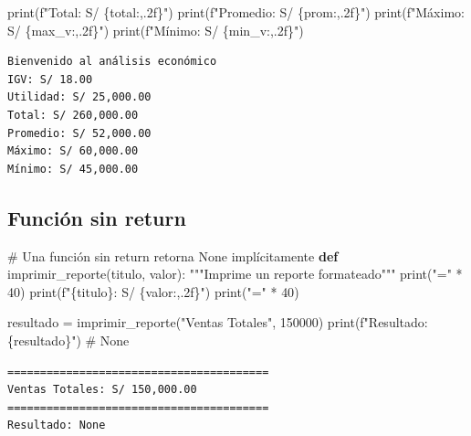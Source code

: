 \documentclass[
  doc,
  floatsintext,
  longtable,
  a4paper,
  nolmodern,
  notxfonts,
  notimes,
  12pt,
  colorlinks=true,linkcolor=blue,citecolor=blue,urlcolor=blue]{apa7}
\newenvironment{Shaded}{\begin{snugshade}}{\end{snugshade}}
\newcommand{\BuiltInTok}[1]{\textcolor[rgb]{0.00,0.23,0.31}{#1}}
\newcommand{\CommentTok}[1]{\textcolor[rgb]{0.37,0.37,0.37}{#1}}
\newcommand{\DecValTok}[1]{\textcolor[rgb]{0.68,0.00,0.00}{#1}}
\newcommand{\KeywordTok}[1]{\textcolor[rgb]{0.00,0.23,0.31}{\textbf{#1}}}
\newcommand{\NormalTok}[1]{\textcolor[rgb]{0.00,0.23,0.31}{#1}}
\newcommand{\OperatorTok}[1]{\textcolor[rgb]{0.37,0.37,0.37}{#1}}
\newcommand{\SpecialCharTok}[1]{\textcolor[rgb]{0.37,0.37,0.37}{#1}}
\newcommand{\SpecialStringTok}[1]{\textcolor[rgb]{0.13,0.47,0.30}{#1}}
\newcommand{\StringTok}[1]{\textcolor[rgb]{0.13,0.47,0.30}{#1}}
\begin{document}
\begin{Shaded}
\begin{Highlighting}[]
\BuiltInTok{print}\NormalTok{(}\SpecialStringTok{f"Total: S/ }\SpecialCharTok{\{}\NormalTok{total}\SpecialCharTok{:,.2f\}}\SpecialStringTok{"}\NormalTok{)}
\BuiltInTok{print}\NormalTok{(}\SpecialStringTok{f"Promedio: S/ }\SpecialCharTok{\{}\NormalTok{prom}\SpecialCharTok{:,.2f\}}\SpecialStringTok{"}\NormalTok{)}
\BuiltInTok{print}\NormalTok{(}\SpecialStringTok{f"Máximo: S/ }\SpecialCharTok{\{}\NormalTok{max\_v}\SpecialCharTok{:,.2f\}}\SpecialStringTok{"}\NormalTok{)}
\BuiltInTok{print}\NormalTok{(}\SpecialStringTok{f"Mínimo: S/ }\SpecialCharTok{\{}\NormalTok{min\_v}\SpecialCharTok{:,.2f\}}\SpecialStringTok{"}\NormalTok{)}
\end{Highlighting}
\end{Shaded}

\begin{verbatim}
Bienvenido al análisis económico
IGV: S/ 18.00
Utilidad: S/ 25,000.00
Total: S/ 260,000.00
Promedio: S/ 52,000.00
Máximo: S/ 60,000.00
Mínimo: S/ 45,000.00
\end{verbatim}

\subsection{Función sin return}\label{funciuxf3n-sin-return}

\begin{Shaded}
\begin{Highlighting}[]
\CommentTok{\# Una función sin return retorna None implícitamente}
\KeywordTok{def}\NormalTok{ imprimir\_reporte(titulo, valor):}
    \CommentTok{"""Imprime un reporte formateado"""}
    \BuiltInTok{print}\NormalTok{(}\StringTok{"="} \OperatorTok{*} \DecValTok{40}\NormalTok{)}
    \BuiltInTok{print}\NormalTok{(}\SpecialStringTok{f"}\SpecialCharTok{\{}\NormalTok{titulo}\SpecialCharTok{\}}\SpecialStringTok{: S/ }\SpecialCharTok{\{}\NormalTok{valor}\SpecialCharTok{:,.2f\}}\SpecialStringTok{"}\NormalTok{)}
    \BuiltInTok{print}\NormalTok{(}\StringTok{"="} \OperatorTok{*} \DecValTok{40}\NormalTok{)}

\NormalTok{resultado }\OperatorTok{=}\NormalTok{ imprimir\_reporte(}\StringTok{"Ventas Totales"}\NormalTok{, }\DecValTok{150000}\NormalTok{)}
\BuiltInTok{print}\NormalTok{(}\SpecialStringTok{f"Resultado: }\SpecialCharTok{\{}\NormalTok{resultado}\SpecialCharTok{\}}\SpecialStringTok{"}\NormalTok{)  }\CommentTok{\# None}
\end{Highlighting}
\end{Shaded}

\begin{verbatim}
========================================
Ventas Totales: S/ 150,000.00
========================================
Resultado: None
\end{verbatim}
\end{document}

